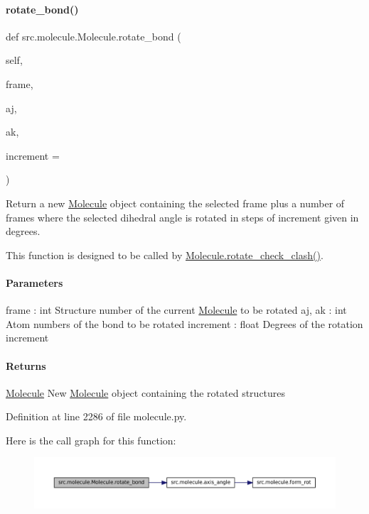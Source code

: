 \paragraph{\texorpdfstring{rotate\+\_\+bond()}{rotate\_bond()}}
{\footnotesize\ttfamily def src.\+molecule.\+Molecule.\+rotate\+\_\+bond (\begin{DoxyParamCaption}\item[{}]{self,  }\item[{}]{frame,  }\item[{}]{aj,  }\item[{}]{ak,  }\item[{}]{increment = {} }\end{DoxyParamCaption})}



Return a new \hyperlink{classsrc_1_1molecule_1_1Molecule}{Molecule} object containing the selected frame plus a number of frames where the selected dihedral angle is rotated in steps of \textquotesingle{}increment\textquotesingle{} given in degrees. 

This function is designed to be called by \hyperlink{classsrc_1_1molecule_1_1Molecule_a011f4f4e9170d8f3c86adf61453142ce}{Molecule.\+rotate\+\_\+check\+\_\+clash()}.

\paragraph*{Parameters }

frame \+: int Structure number of the current \hyperlink{classsrc_1_1molecule_1_1Molecule}{Molecule} to be rotated aj, ak \+: int Atom numbers of the bond to be rotated increment \+: float Degrees of the rotation increment

\paragraph*{Returns }

\hyperlink{classsrc_1_1molecule_1_1Molecule}{Molecule} New \hyperlink{classsrc_1_1molecule_1_1Molecule}{Molecule} object containing the rotated structures 

Definition at line 2286 of file molecule.\+py.

Here is the call graph for this function\+:
\nopagebreak
\begin{figure}[H]
\begin{center}
\leavevmode
\includegraphics[width=350pt]{classsrc_1_1molecule_1_1Molecule_ae8aa53ace87ec66daf8264b2add069c3_cgraph}
\end{center}
\end{figure}
\mbox{\label{classsrc_1_1molecule_1_1Molecule_a011f4f4e9170d8f3c86adf61453142ce}} 
